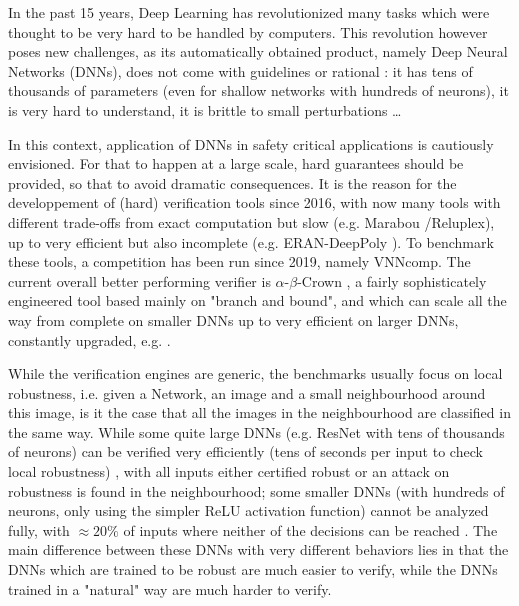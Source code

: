 In the past 15 years, Deep Learning has revolutionized many tasks which were thought to be very hard to be handled by computers. This revolution however poses new challenges, as its automatically obtained product, namely Deep Neural Networks (DNNs), does not come with guidelines or rational : it has tens of thousands of parameters (even for shallow networks with hundreds of neurons), it is very hard to understand, it is brittle to small perturbations 
\cite{szegedy}\dots

In this context, application of DNNs in safety critical applications is cautiously envisioned. For that to happen at a large scale, hard guarantees should be provided, so that to avoid dramatic consequences. It is the reason for the developpement of (hard) verification tools since 2016, with now many tools with different trade-offs from exact computation but slow (e.g. Marabou \cite{katz2019marabou}/Reluplex\cite{Reluplex}), up to very efficient but also incomplete (e.g. ERAN-DeepPoly \cite{deeppoly}). To benchmark these tools, a competition has been run since 2019, namely VNNcomp. The current overall better performing verifier is $\alpha$-$\beta$-Crown \cite{crown}, a fairly sophisticately engineered tool based mainly on "branch and bound", and which can scale all the way from complete on smaller DNNs \cite{xu2020fast} up to very efficient on larger DNNs, constantly upgraded, e.g. \cite{cutting}.


While the verification engines are generic, the benchmarks usually focus on local robustness, i.e. given a Network, an image and a small neighbourhood around this image, 
is it the case that all the images in the neighbourhood are classified in the same way.
While some quite large DNNs (e.g. ResNet with tens of thousands of neurons) can be verified very efficiently (tens of seconds per input to check local robustness) \cite{crown}, with all inputs either certified robust or an attack on robustness is found in the neighbourhood;
some smaller DNNs (with hundreds of neurons, only using the simpler ReLU activation function) cannot be analyzed fully, with $\approx 20 \%$ of inputs where neither of the decisions can be reached \cite{crown}. The main difference between these DNNs with very different behaviors lies in that the DNNs which are trained to be robust are much easier to verify, while the DNNs trained in a "natural" way are much harder to verify.


